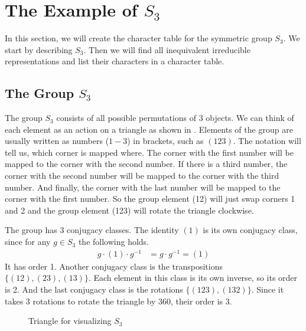 \section{The Example of $S_3$}

In this section, we will create the character table for the symmetric group $S_3$.
We start by describing $S_3$.
Then we will find all inequivalent irreducible representations and list their characters in a character table.

\subsection{The Group $S_3$}

The group $S_3$ consists of all possible permutations of $3$ objects.
We can think of each element as an action on a triangle as shown in .
Elements of the group are usually written as numbers ($1-3$) in brackets, such as $(123)$.
The notation will tell us, which corner is mapped where.
The corner with the first number will be mapped to the corner with the second number.
If there is a third number, the corner with the second number will be mapped to the corner with the third number.
And finally, the corner with the last number will be mapped to the corner with the first number.
So the group element (12) will just swap corners 1 and 2 and the group element (123) will rotate the triangle clockwise.

The group has 3 conjugacy classes.
The identity $(1)$ is its own conjugacy class, since for any $g \in S_3$ the following holds.
\begin{align}
    g \cdot (1) \cdot g^{-1} & = g \cdot g^{-1} = (1)
\end{align}
It has order 1.
Another conjugacy class is the transpositions $\{(12), (23), (13)\}$. 
Each element in this class is its own inverse, so its order is 2.
And the last conjugacy class is the rotations $\{(123), (132)\}$.
Since it takes 3 rotations to rotate the triangle by 360\textdegree, their order is 3.

\begin{figure}[!h]
    \centering
    

    \caption{Triangle for visualizing $S_3$}
    \label{fig:reprep.char.triangle}
\end{figure}


